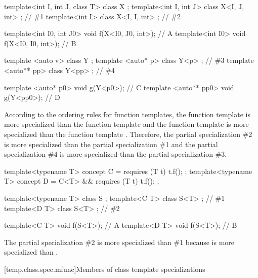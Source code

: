 \pnum
\begin{example}
\begin{codeblock}
template<int I, int J, class T> class X { };
template<int I, int J>          class X<I, J, int> { };         // \#1
template<int I>                 class X<I, I, int> { };         // \#2

template<int I0, int J0> void f(X<I0, J0, int>);                // A
template<int I0>         void f(X<I0, I0, int>);                // B

template <auto v>    class Y { };
template <auto* p>   class Y<p> { };                            // \#3
template <auto** pp> class Y<pp> { };                           // \#4

template <auto* p0>   void g(Y<p0>);                            // C
template <auto** pp0> void g(Y<pp0>);                           // D
\end{codeblock}

According to the ordering rules for function templates,
the function template
is more specialized than the function template
and
the function template
is more specialized than the function template
.
Therefore, the partial specialization \#2
is more specialized than the partial specialization \#1
and the partial specialization \#4
is more specialized than the partial specialization \#3.
\end{example}
\begin{example}
\begin{codeblock}
template<typename T> concept C = requires (T t) { t.f(); };
template<typename T> concept D = C<T> && requires (T t) { t.f(); };

template<typename T> class S { };
template<C T> class S<T> { };   // \#1
template<D T> class S<T> { };   // \#2

template<C T> void f(S<T>);     // A
template<D T> void f(S<T>);     // B
\end{codeblock}
The partial specialization \#2 is more specialized than \#1
because  is more specialized than .
\end{example}

[temp.class.spec.mfunc]{Members of class template specializations}


